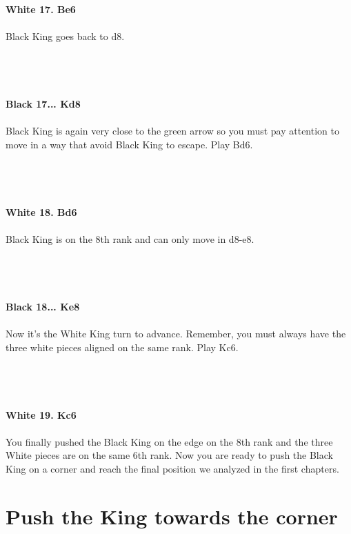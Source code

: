 \documentclass{article}
\begin{document}
\\

\\
\\
\textbf{White 17. Be6}\\
\\
Black King goes back to d8.\\\\
\\

\\
\\
\textbf{Black 17... Kd8}\\
\\
Black King is again very close to the green arrow so you must pay attention to move in a way that avoid Black King to escape. Play Bd6.\\\\
\\

\\
\\
\textbf{White 18. Bd6}\\
\\
Black King is on the 8th rank and can only move in d8-e8.\\\\
\\

\\
\\
\textbf{Black 18... Ke8}\\
\\
Now it's the White King turn to advance. Remember, you must always have the three white pieces aligned on the same rank. Play Kc6.\\\\
\\

\\
\\
\textbf{White 19. Kc6}\\
\\
You finally pushed the Black King on the edge on the 8th rank and the three White pieces are on the same 6th rank. Now you are ready to push the Black King on a corner and reach the final position we analyzed in the first chapters.\\\section{ Push the King towards the corner}
\end{document}
